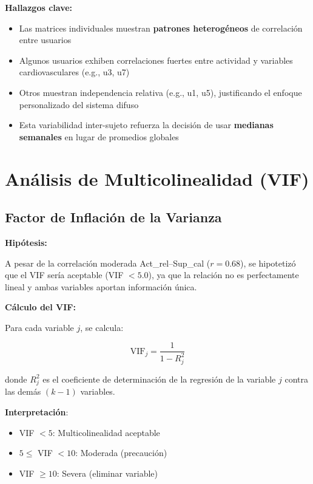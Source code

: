 \documentclass[12pt,letterpaper,twoside]{report}
\begin{document}
\textbf{Hallazgos clave:}
\begin{itemize}[noitemsep]
    \item Las matrices individuales muestran \textbf{patrones heterogéneos} de correlación entre usuarios
    \item Algunos usuarios exhiben correlaciones fuertes entre actividad y variables cardiovasculares (e.g., u3, u7)
    \item Otros muestran independencia relativa (e.g., u1, u5), justificando el enfoque personalizado del sistema difuso
    \item Esta variabilidad inter-sujeto refuerza la decisión de usar \textbf{medianas semanales} en lugar de promedios globales
\end{itemize}

\section{Análisis de Multicolinealidad (VIF)}

\subsection{Factor de Inflación de la Varianza}

\begin{hipotesisbox}
\textbf{Hipótesis:}

A pesar de la correlación moderada Act\_rel--Sup\_cal ($r=0.68$), se hipotetizó que el VIF sería aceptable (VIF $< 5.0$), ya que la relación no es perfectamente lineal y ambas variables aportan información única.
\end{hipotesisbox}

\begin{estadisticobox}
\textbf{Cálculo del VIF:}

Para cada variable $j$, se calcula:

\begin{equation}
\text{VIF}_j = \frac{1}{1 - R^2_j}
\end{equation}

donde $R^2_j$ es el coeficiente de determinación de la regresión de la variable $j$ contra las demás $(k-1)$ variables.

\textbf{Interpretación}:
\begin{itemize}[noitemsep]
    \item VIF $< 5$: Multicolinealidad aceptable
    \item $5 \leq$ VIF $< 10$: Moderada (precaución)
    \item VIF $\geq 10$: Severa (eliminar variable)
\end{itemize}
\end{estadisticobox}
\end{document}
